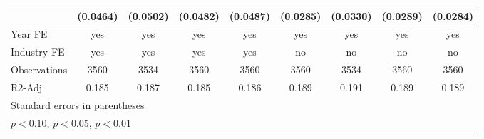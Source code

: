 \begin{table}[htbp]
\begin{tabular}{l*{8}{c}}
                    &    (0.0464)         &    (0.0502)         &    (0.0482)         &    (0.0487)         &    (0.0285)         &    (0.0330)         &    (0.0289)         &    (0.0284)         \\
\hline
Year FE             &         yes         &         yes         &         yes         &         yes         &         yes         &         yes         &         yes         &         yes         \\
Industry FE         &         yes         &         yes         &         yes         &         yes         &          no         &          no         &          no         &          no         \\
Observations        &        3560         &        3534         &        3560         &        3560         &        3560         &        3534         &        3560         &        3560         \\
R2-Adj              &       0.185         &       0.187         &       0.185         &       0.186         &       0.189         &       0.191         &       0.189         &       0.189         \\
\hline\hline
\multicolumn{9}{l}{\footnotesize Standard errors in parentheses}\\
\multicolumn{9}{l}{\footnotesize \sym{*} \(p<0.10\), \sym{**} \(p<0.05\), \sym{***} \(p<0.01\)}\\
\end{tabular}
\end{table}

